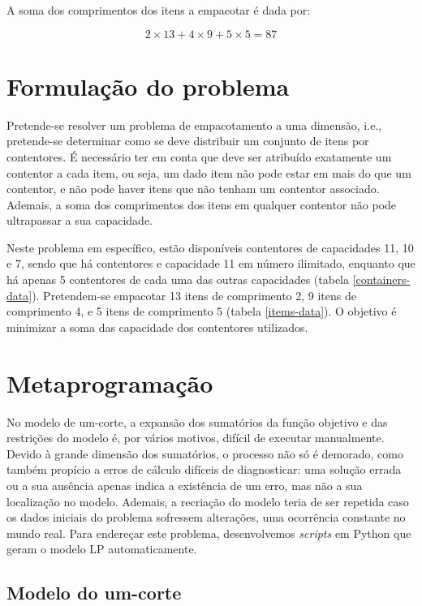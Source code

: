\documentclass[12pt, a4paper, titlepage]{article}
\begin{document}
A soma dos comprimentos dos itens a empacotar é dada por:

$$2 \times 13 + 4 \times 9 + 5 \times 5 = 87$$

\section{Formulação do problema}

Pretende-se resolver um problema de empacotamento a uma dimensão, i.e., pretende-se determinar como
se deve distribuir um conjunto de itens por contentores. É necessário ter em conta que deve ser
atribuído exatamente um contentor a cada item, ou seja, um dado item não pode estar em mais do que
um contentor, e não pode haver itens que não tenham um contentor associado. Ademais, a soma dos
comprimentos dos itens em qualquer contentor não pode ultrapassar a sua capacidade.

Neste problema em específico, estão disponíveis contentores de capacidades 11, 10 e 7, sendo que há
contentores e capacidade 11 em número ilimitado, enquanto que há apenas 5 contentores de cada uma
das outras capacidades (tabela \ref{containers-data}). Pretendem-se empacotar 13 itens de
comprimento 2, 9 itens de comprimento 4, e 5 itens de comprimento 5 (tabela \ref{items-data}). O
objetivo é minimizar a soma das capacidade dos contentores utilizados.


\section{Metaprogramação}

No modelo de um-corte, a expansão dos sumatórios da função objetivo e das restrições do modelo é,
por vários motivos, difícil de executar manualmente. Devido à grande dimensão dos sumatórios, o
processo não só é demorado, como também propício a erros de cálculo difíceis de diagnosticar: uma
solução errada ou a sua ausência apenas indica a existência de um erro, mas não a sua localização
no modelo. Ademais, a recriação do modelo teria de ser repetida caso os dados iniciais do problema
sofressem alterações, uma ocorrência constante no mundo real. Para endereçar este problema,
desenvolvemos \emph{scripts} em Python que geram o modelo LP automaticamente.

\subsection{Modelo do um-corte}
\end{document}
